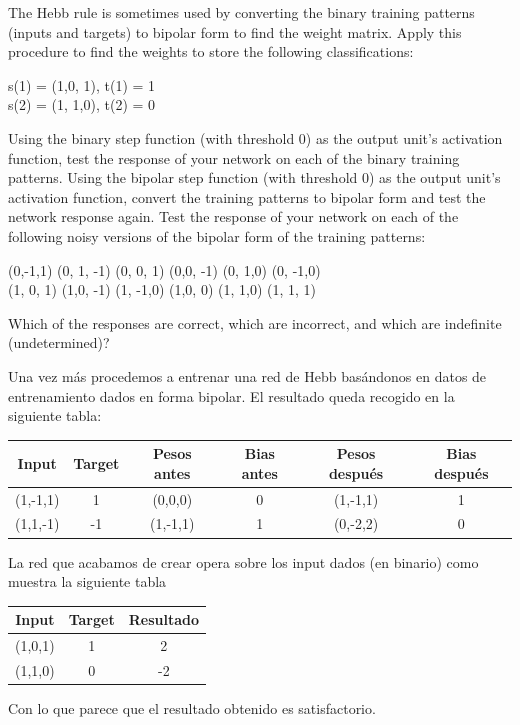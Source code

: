 \begin{problem}[6]
\ppart The Hebb rule is sometimes used by converting the binary training patterns (inputs
and targets) to bipolar form to find the weight matrix. Apply this procedure to
find the weights to store the following classifications:
\begin{center}
s(1) = (1,0, 1), t(1) = 1\\
s(2) = (1, 1,0), t(2) = 0
\end{center}
\ppart Using the binary step function (with threshold 0) as the output unit's activation
function, test the response of your network on each of the binary training patterns.
\ppart Using the bipolar step function (with threshold 0) as the output unit's activation
function, convert the training patterns to bipolar form and test the network response again.
\ppart Test the response of your network on each of the following noisy versions of the
bipolar form of the training patterns:
\begin{center}
(0,-1,1) (0, 1, -1) (0, 0, 1) (0,0, -1) (0, 1,0) (0, -1,0)\\
(1, 0, 1) (1,0, -1) (1, -1,0) (1,0, 0) (1, 1,0) (1, 1, 1)
\end{center}
Which of the responses are correct, which are incorrect, and which are indefinite
(undetermined)?

\solution
\spart
Una vez más procedemos a entrenar una red de Hebb basándonos en datos de entrenamiento dados en forma bipolar. El resultado queda recogido en la siguiente tabla:
\begin{center}
\begin{tabular}{|c|c|c|c|c|c|}
\hline
\textbf{Input} & \textbf{Target} & \textbf{Pesos antes} & \textbf{Bias antes} & \textbf{Pesos después} & \textbf{Bias después} \\
\hline
(1,-1,1) & 1  & (0,0,0) & 0 & (1,-1,1) & 1\\
(1,1,-1) & -1 & (1,-1,1) & 1 & (0,-2,2) & 0\\
\hline
\end{tabular}
\end{center}

\spart
La red que acabamos de crear opera sobre los input dados (en binario) como muestra la siguiente tabla
\begin{center}
\begin{tabular}{|c|c|c|}
\hline
\textbf{Input} & \textbf{Target} & \textbf{Resultado} \\
\hline
(1,0,1) & 1  & 2\\
(1,1,0) & 0 & -2\\
\hline
\end{tabular}
\end{center}
Con lo que parece que el resultado obtenido es satisfactorio.


\end{problem}
